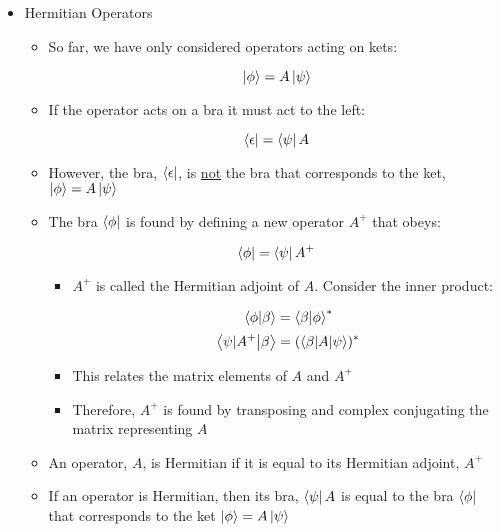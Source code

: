 \begin{itemize}

  \item Hermitian Operators

    \begin{itemize}

      \item So far, we have only considered operators acting on kets:

        $$\ket{\phi}=A\ket{\psi}$$

      \item If the operator acts on a bra it must act to the left:

        $$\bra{\epsilon}=\bra{\psi}A$$

      \item However, the bra, $\bra{\epsilon}$, is \underline{not} the bra that corresponds to the ket, $\ket{\phi}=A\ket{\psi}$

      \item The bra $\bra{\phi}$ is found by defining a new operator $A^+$ that obeys:

        $$\bra{\phi}=\bra{\psi}A^{+}$$

        \begin{itemize}

          \item $A^{+}$ is called the Hermitian adjoint of $A$. Consider the inner product:

            $$\bra{\phi}\ket{\beta}=\bra{\beta}\ket{\phi}^*$$
            $$\bra{\psi|A^{+}}\ket{\beta}=(\bra{\beta|A}\ket{\psi})^*$$

          \item This relates the matrix elements of $A$ and $A^{+}$
            
          \item Therefore, $A^{+}$ is found by transposing and complex conjugating the matrix representing $A$

        \end{itemize}

      \item An operator, $A$, is Hermitian if it is equal to its Hermitian adjoint, $A^{+}$

      \item If an operator is Hermitian, then its bra, $\bra{\psi}A$ is equal to the bra $\bra{\phi}$ that corresponds to the ket $\ket{\phi}=A\ket{\psi}$

        \begin{itemize}


\end{itemize}
\end{itemize}
\end{itemize}
